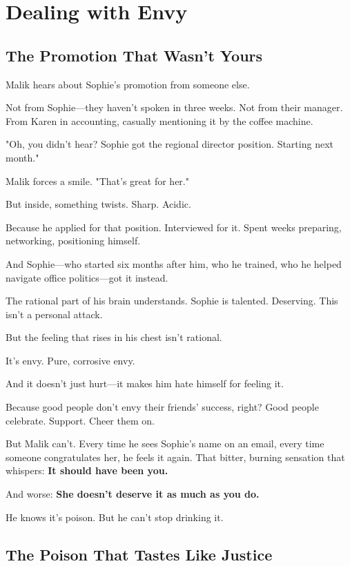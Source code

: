 \documentclass[11pt,twoside]{book}
\begin{document}
\chapter{Dealing with Envy}

\section*{The Promotion That Wasn't Yours}

Malik hears about Sophie's promotion from someone else.

Not from Sophie—they haven't spoken in three weeks. Not from their manager. From Karen in accounting, casually mentioning it by the coffee machine.

"Oh, you didn't hear? Sophie got the regional director position. Starting next month."

Malik forces a smile. "That's great for her."

But inside, something twists. Sharp. Acidic.

Because he applied for that position. Interviewed for it. Spent weeks preparing, networking, positioning himself.

And Sophie—who started six months after him, who he trained, who he helped navigate office politics—got it instead.

The rational part of his brain understands. Sophie is talented. Deserving. This isn't a personal attack.

But the feeling that rises in his chest isn't rational.

It's envy. Pure, corrosive envy.

And it doesn't just hurt—it makes him hate himself for feeling it.

Because good people don't envy their friends' success, right? Good people celebrate. Support. Cheer them on.

But Malik can't. Every time he sees Sophie's name on an email, every time someone congratulates her, he feels it again. That bitter, burning sensation that whispers: \textbf{It should have been you.}

And worse: \textbf{She doesn't deserve it as much as you do.}

He knows it's poison. But he can't stop drinking it.

\section*{The Poison That Tastes Like Justice}
\end{document}
